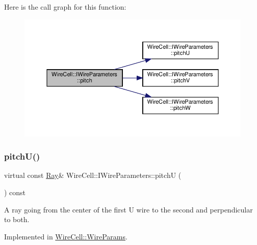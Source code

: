 Here is the call graph for this function\+:
\nopagebreak
\begin{figure}[H]
\begin{center}
\leavevmode
\includegraphics[width=350pt]{class_wire_cell_1_1_i_wire_parameters_aafb960715541113e82448f74e0f34e46_cgraph}
\end{center}
\end{figure}
\mbox{\label{class_wire_cell_1_1_i_wire_parameters_a37e3bb80331664feb75d00eb957fda78}} 
\subsubsection{\texorpdfstring{pitch\+U()}{pitchU()}}
{\footnotesize\ttfamily virtual const \hyperlink{namespace_wire_cell_a3ab20d9b438feb7eb1ffaab9ba98af0c}{Ray}\& Wire\+Cell\+::\+I\+Wire\+Parameters\+::pitchU (\begin{DoxyParamCaption}{ }\end{DoxyParamCaption}) const\hspace{0.3cm}{\ttfamily [pure virtual]}}

A ray going from the center of the first U wire to the second and perpendicular to both. 

Implemented in \hyperlink{class_wire_cell_1_1_wire_params_a8d61eb6c6ef8d3320172840079891322}{Wire\+Cell\+::\+Wire\+Params}.

